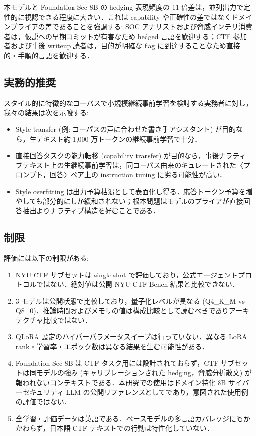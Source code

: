 \documentclass[10pt,twocolumn,a4paper]{ltjsarticle}
\begin{document}
本モデルと Foundation-Sec-8B の hedging 表現頻度の 11 倍差は，並列出力で定性的に視認できる程度に大きい．これは capability や正確性の差ではなくドメインプライアの差であることを強調する: SOC アナリストおよび脅威インテリ消費者は，仮説への早期コミットが有害なため hedged 言語を歓迎する；CTF 参加者および事後 writeup 読者は，目的が明確な flag に到達することなため直接的・手順的言語を歓迎する．

\subsection{実務的推奨}

スタイル的に特徴的なコーパスで小規模継続事前学習を検討する実務者に対し，我々の結果は次を示唆する:

\begin{itemize}
\item Style transfer (例: コーパスの声に合わせた書き手アシスタント) が目的なら，生テキスト約 1{,}000 万トークンの継続事前学習で十分．
\item 直接回答タスクの能力転移 (capability transfer) が目的なら，事後ナラティブテキスト上の生継続事前学習は，同コーパス由来のキュレートされた〈プロンプト，回答〉ペア上の instruction tuning に劣る可能性が高い．
\item Style overfitting は出力予算枯渇として表面化し得る．応答トークン予算を増やしても部分的にしか緩和されない；根本問題はモデルのプライアが直接回答抽出よりナラティブ構造を好むことである．
\end{itemize}

\subsection{制限}

評価には以下の制限がある:

\begin{enumerate}
\item NYU CTF サブセットは single-shot で評価しており，公式エージェントプロトコルではない．絶対値は公開 NYU CTF Bench 結果と比較できない．
\item 3 モデルは公開状態で比較しており，量子化レベルが異なる (Q4{\_}K{\_}M vs Q8{\_}0)．推論時間およびメモリの値は構成比較として読むべきでありアーキテクチャ比較ではない．
\item QLoRA 設定のハイパーパラメータスイープは行っていない．異なる LoRA rank・学習率・エポック数は異なる結果を生む可能性がある．
\item Foundation-Sec-8B は CTF タスク用には設計されておらず，CTF サブセットは同モデルの強み (キャリブレーションされた hedging，脅威分析散文) が報われないコンテキストである．本研究での使用はドメイン特化 8B サイバーセキュリティ LLM の公開リファレンスとしてであり，意図された使用例の評価ではない．
\item 全学習・評価データは英語である．ベースモデルの多言語カバレッジにもかかわらず，日本語 CTF テキストでの行動は特性化していない．
\end{enumerate}
\end{document}
